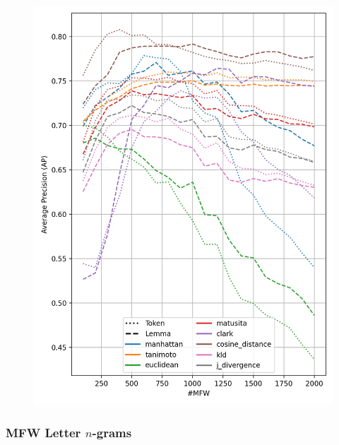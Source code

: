 \begin{figure}
  \label{fig:token_vs_lemma_st_jean}
  \includegraphics[width=0.9\linewidth]{img/token_vs_lemma_st_jean.png}
\end{figure}

\subsubsection{MFW Letter $n$-grams}

